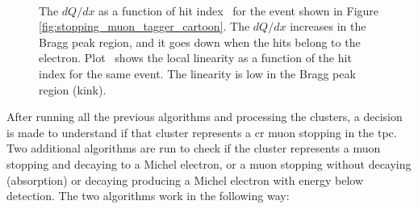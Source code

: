 \begin{figure}[]
\centering
{} \quad 
{} \\ 
\caption[$dQ/dx$ and Linearity for a Cosmic Ray Stoping Muon]{The $dQ/dx$ as a function of hit index~\protect{} for the event shown in Figure \ref{fig:stopping_muon_tagger_cartoon}. The $dQ/dx$ increases in the Bragg peak region, and it goes down when the hits belong to the electron. Plot~\protect{} shows the local linearity as a function of the hit index for the same event. The linearity is low in the Bragg peak region (kink).}
\label{fig:stopmu_tagger_2744}
\end{figure}


After running all the previous algorithms and processing the clusters, a decision is made to understand if that cluster represents a \acrshort{cr} muon stopping in the \acrshort{tpc}. Two additional algorithms are run to check if the cluster represents a muon stopping and decaying to a Michel electron, or a muon stopping without decaying (absorption) or decaying producing a Michel electron with energy below detection. The two algorithms work in the following way:

